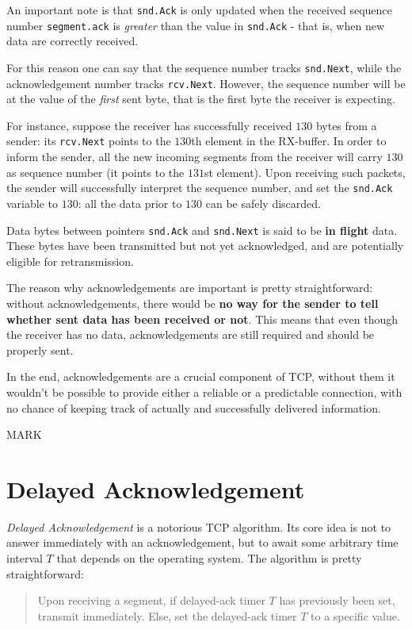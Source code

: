 \documentclass[10pt]{book}
\begin{document}
An important note is that \texttt{snd.Ack} is only updated when the received
sequence number \texttt{segment.ack} is \emph{greater} than the value in
\texttt{snd.Ack} \-- that is, when new data are correctly received.

For this reason one can say that the sequence number tracks \texttt{snd.Next},
while the acknowledgement number tracks \texttt{rcv.Next}. However, the
sequence number will be at the value of the \emph{first} sent byte, that is the
first byte the receiver is expecting.

For instance, suppose the receiver has successfully received $130$ bytes from a
sender: its \texttt{rcv.Next} points to the $130$th element in the RX-buffer.
In order to inform the sender, all the new incoming segments from the receiver
will carry $130$ as sequence number (it points to the $131$st element). Upon
receiving such packets, the sender will successfully interpret the sequence
number, and set the \texttt{snd.Ack} variable to $130$: all the data prior to
$130$ can be safely discarded.

Data bytes between pointers \texttt{snd.Ack} and \texttt{snd.Next} is said to
be \textbf{in flight} data. These bytes have been transmitted but not yet
acknowledged, and are potentially eligible for retransmission.

The reason why acknowledgements are important is pretty straightforward: without
acknowledgements, there would be \textbf{no way for the sender to tell whether
sent data has been received or not}. This means that even though the receiver
has no data, acknowledgements are still required and should be properly sent.

In the end, acknowledgements are a crucial component of TCP, without them it
wouldn't be possible to provide either a reliable or a predictable connection,
with no chance of keeping track of actually and successfully delivered
information.


MARK
\section{Delayed Acknowledgement}

\emph{Delayed Acknowledgement} is a notorious TCP algorithm. Its core idea is
not to answer immediately with an acknowledgement, but to await some arbitrary
time interval $T$ that depends on the operating system. The algorithm is pretty
straightforward:

\begin{quote}
Upon receiving a segment, if delayed-ack timer $T$ has previously been set,
transmit immediately. Else, set the delayed-ack timer $T$ to a specific value.
\end{quote}
\end{document}
